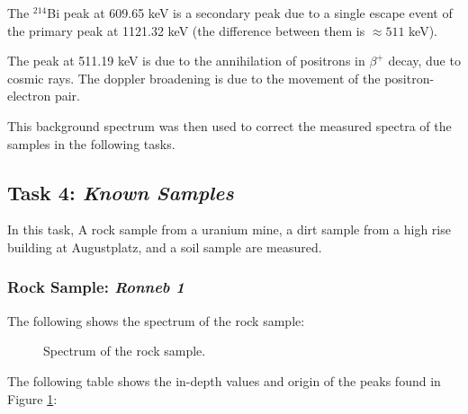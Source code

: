 \documentclass{article}
\begin{document}
The $^{214}$Bi peak at 609.65 keV is a secondary peak due to a single escape event of the primary peak at 1121.32 keV (the difference between them is $\approx 511$ keV).

The peak at 511.19 keV is due to the annihilation of positrons in $\beta^+$ decay, due to cosmic rays. The doppler broadening is due to the movement of the positron-electron pair.

This background spectrum was then used to correct the measured spectra of the samples in the following tasks.

\pagebreak{}

\subsection{Task 4: \textit{Known Samples}}

In this task, A rock sample from a uranium mine, a dirt sample from a high rise building at Augustplatz, and a soil sample are measured.

\subsubsection{Rock Sample: \textit{Ronneb 1}}

The following shows the spectrum of the rock sample:

\begin{figure}[h!]
	\centering
	\scalebox{1}{}
	\caption{Spectrum of the rock sample.}
	\label{fig:Rock}
\end{figure}

The following table shows the in-depth values and origin of the peaks found in Figure \ref{fig:Rock}:
\end{document}
